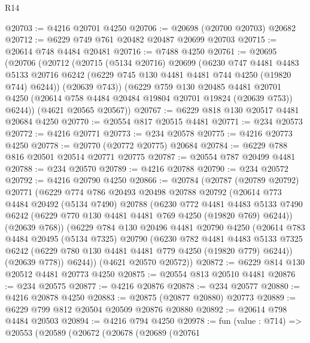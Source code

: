\begin{lexlean}{R14}
\begin{coremodule}
@20703 := @4216 @20701 @4250
@20706 := @20698 (@20700 @20703) @20682
@20712 := @6229 @749 @761 @20482 @20487 @20699 @20703
@20715 := @20614 @748 @4484 @20481
@20716 := @7488 @4250
@20761 := @20695
    (@20706
      (@20712
        (@20715
          (@5134 @20716)
          @20699
          (@6230
            @747
            @4481
            @4483
            @5133
            @20716
            @6242
            (@6229 @745 @130 @4481 @4481 @744 @4250 (@19820 @744) @6244))
          (@20639 @743))
        (@6229
          @759
          @130
          @20485
          @4481
          @20701
          @4250
          (@20614 @758 @4484 @20484 @19804 @20701 @19824 (@20639 @753))
          @6244))
      (@4621 @20565 @20567))
@20767 := @6229 @818 @130 @20517 @4481 @20684 @4250
@20770 := @20554 @817 @20515 @4481
@20771 := @234 @20573
@20772 := @4216 @20771
@20773 := @234 @20578
@20775 := @4216 @20773 @4250
@20778 := @20770 (@20772 @20775) @20684
@20784 := @6229 @788 @816 @20501 @20514 @20771 @20775
@20787 := @20554 @787 @20499 @4481
@20788 := @234 @20570
@20789 := @4216 @20788
@20790 := @234 @20572
@20792 := @4216 @20790 @4250
@20866 := @20784
    (@20787
      (@20789 @20792)
      @20771
      (@6229
        @774
        @786
        @20493
        @20498
        @20788
        @20792
        (@20614
          @773
          @4484
          @20492
          (@5134 @7490)
          @20788
          (@6230
            @772
            @4481
            @4483
            @5133
            @7490
            @6242
            (@6229 @770 @130 @4481 @4481 @769 @4250 (@19820 @769) @6244))
          (@20639 @768))
        (@6229
          @784
          @130
          @20496
          @4481
          @20790
          @4250
          (@20614
            @783
            @4484
            @20495
            (@5134 @7325)
            @20790
            (@6230
              @782
              @4481
              @4483
              @5133
              @7325
              @6242
              (@6229 @780 @130 @4481 @4481 @779 @4250 (@19820 @779) @6244))
            (@20639 @778))
          @6244))
      (@4621 @20570 @20572))
@20872 := @6229 @814 @130 @20512 @4481 @20773 @4250
@20875 := @20554 @813 @20510 @4481
@20876 := @234 @20575
@20877 := @4216 @20876
@20878 := @234 @20577
@20880 := @4216 @20878 @4250
@20883 := @20875 (@20877 @20880) @20773
@20889 := @6229 @799 @812 @20504 @20509 @20876 @20880
@20892 := @20614 @798 @4484 @20503
@20894 := @4216 @794 @4250
@20978 := fun (value : @714) =>
  @20553
    (@20589
      (@20672
        (@20678
          (@20689
            (@20761

\end{coremodule}
\end{lexlean}
